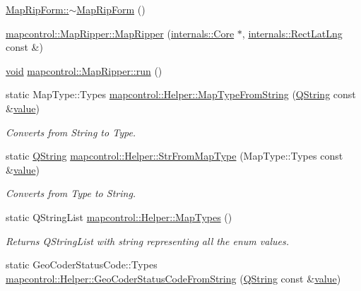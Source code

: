 \begin{DoxyCompactItemize}
\item 
\hyperlink{group___o_p_map_widget_gabc703f61b0a3e678f85ec3fa6b9c896a}{Map\-Rip\-Form\-::$\sim$\-Map\-Rip\-Form} ()
\item 
\hyperlink{group___o_p_map_widget_ga8c3645377b4deb3dc4d498de823ff3fd}{mapcontrol\-::\-Map\-Ripper\-::\-Map\-Ripper} (\hyperlink{classinternals_1_1_core}{internals\-::\-Core} $\ast$, \hyperlink{structinternals_1_1_rect_lat_lng}{internals\-::\-Rect\-Lat\-Lng} const \&)
\item 
\hyperlink{group___u_a_v_objects_plugin_ga444cf2ff3f0ecbe028adce838d373f5c}{void} \hyperlink{group___o_p_map_widget_gab955ee8425cb4937440d817492b47a88}{mapcontrol\-::\-Map\-Ripper\-::run} ()
\item 
static Map\-Type\-::\-Types \hyperlink{group___o_p_map_widget_gae829b229cde8f7beebc9f3c0981f674c}{mapcontrol\-::\-Helper\-::\-Map\-Type\-From\-String} (\hyperlink{group___u_a_v_objects_plugin_gab9d252f49c333c94a72f97ce3105a32d}{Q\-String} const \&\hyperlink{glext_8h_aa0e2e9cea7f208d28acda0480144beb0}{value})
\begin{DoxyCompactList}\small\item\em Converts from String to Type. \end{DoxyCompactList}\item 
static \hyperlink{group___u_a_v_objects_plugin_gab9d252f49c333c94a72f97ce3105a32d}{Q\-String} \hyperlink{group___o_p_map_widget_ga25fd053ddcb478b681163806de9514b7}{mapcontrol\-::\-Helper\-::\-Str\-From\-Map\-Type} (Map\-Type\-::\-Types const \&\hyperlink{glext_8h_aa0e2e9cea7f208d28acda0480144beb0}{value})
\begin{DoxyCompactList}\small\item\em Converts from Type to String. \end{DoxyCompactList}\item 
static Q\-String\-List \hyperlink{group___o_p_map_widget_gad4c683c34a93de153146c87382c53719}{mapcontrol\-::\-Helper\-::\-Map\-Types} ()
\begin{DoxyCompactList}\small\item\em Returns Q\-String\-List with string representing all the enum values. \end{DoxyCompactList}\item 
static Geo\-Coder\-Status\-Code\-::\-Types \hyperlink{group___o_p_map_widget_gad60261d49176a6eea081705bcd37c2b7}{mapcontrol\-::\-Helper\-::\-Geo\-Coder\-Status\-Code\-From\-String} (\hyperlink{group___u_a_v_objects_plugin_gab9d252f49c333c94a72f97ce3105a32d}{Q\-String} const \&\hyperlink{glext_8h_aa0e2e9cea7f208d28acda0480144beb0}{value})

\end{DoxyCompactItemize}
